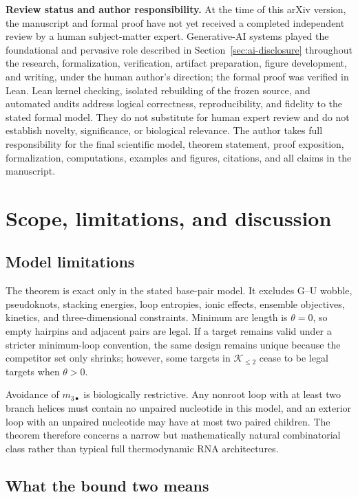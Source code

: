 \documentclass[11pt]{article}
\newcommand{\Ktwo}{\mathcal{K}_{\le 2}}
\begin{document}
\noindent\textbf{Review status and author responsibility.} At the time of this arXiv version, the manuscript and formal proof have not yet received a completed independent review by a human subject-matter expert. Generative-AI systems played the foundational and pervasive role described in Section~\ref{sec:ai-disclosure} throughout the research, formalization, verification, artifact preparation, figure development, and writing, under the human author's direction; the formal proof was verified in Lean. Lean kernel checking, isolated rebuilding of the frozen source, and automated audits address logical correctness, reproducibility, and fidelity to the stated formal model. They do not substitute for human expert review and do not establish novelty, significance, or biological relevance. The author takes full responsibility for the final scientific model, theorem statement, proof exposition, formalization, computations, examples and figures, citations, and all claims in the manuscript.

\section{Scope, limitations, and discussion}
\label{sec:scope}

\subsection{Model limitations}

The theorem is exact only in the stated base-pair model.  It excludes G--U wobble, pseudoknots, stacking energies, loop entropies, ionic effects, ensemble objectives, kinetics, and three-dimensional constraints.  Minimum arc length is $\theta=0$, so empty hairpins and adjacent pairs are legal.  If a target remains valid under a stricter minimum-loop convention, the same design remains unique because the competitor set only shrinks; however, some targets in $\Ktwo$ cease to be legal targets when $\theta>0$.

Avoidance of $m_{3\bullet}$ is biologically restrictive.  Any nonroot loop with at least two branch helices must contain no unpaired nucleotide in this model, and an exterior loop with an unpaired nucleotide may have at most two paired children.  The theorem therefore concerns a narrow but mathematically natural combinatorial class rather than typical full thermodynamic RNA architectures.

\subsection{What the bound two means}
\end{document}
